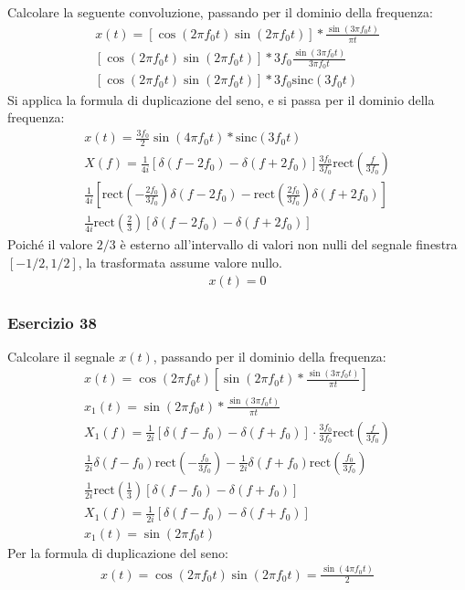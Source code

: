 \documentclass{article}
\newcommand{\rect}{\mathrm{rect}}
\newcommand{\sinc}{\mathrm{sinc}}
\begin{document}
Calcolare la seguente convoluzione, passando per il dominio della frequenza:
\begin{gather*}
    x(t)=\left[\cos(2\pi f_0t)\sin(2\pi f_0t)\right]*\displaystyle\frac{\sin(3\pi f_0t)}{\pi t}\\
    \left[\cos(2\pi f_0t)\sin(2\pi f_0t)\right]*\displaystyle3f_0\frac{\sin(3\pi f_0t)}{3\pi f_0t}\\
    \left[\cos(2\pi f_0t)\sin(2\pi f_0t)\right]*3f_0\sinc(3f_0 t)
\end{gather*}
Si applica la formula di duplicazione del seno, e si passa per il dominio della frequenza:
\begin{gather*}
    x(t)=\displaystyle\frac{3f_0}{2}\sin(4\pi f_0t)*\sinc(3f_0t)\\
    X(f)=\displaystyle\frac{1}{4i}\left[\delta(f-2f_0)-\delta(f+2f_0)\right]\frac{3f_0}{3f_0}\rect\left(\frac{f}{3f_0}\right)\\
    \displaystyle\frac{1}{4i}\left[\rect\left(-\frac{2f_0}{3f_0}\right)\delta(f-2f_0)-\rect\left(\frac{2f_0}{3f_0}\right)\delta(f+2f_0)\right]\\
    \displaystyle\frac{1}{4i}\rect\left(\frac{2}{3}\right)\left[\delta(f-2f_0)-\delta(f+2f_0)\right]
\end{gather*}
Poiché il valore $2/3$ è esterno all'intervallo di valori non nulli del segnale finestra $[-1/2,1/2]$, la trasformata assume valore nullo. 
\begin{gather}
    x(t)=0
\end{gather}

\subsubsection*{Esercizio 38}

Calcolare il segnale $x(t)$, passando per il dominio della frequenza:
\begin{gather*}
    x(t)=\cos(2\pi f_0t)\left[\sin(2\pi f_0t)*\displaystyle\frac{\sin(3\pi f_0t)}{\pi t}\right]\\
    x_1(t)=\sin(2\pi f_0t)*\displaystyle\frac{\sin(3\pi f_0t)}{\pi t}\\
    X_1(f)=\displaystyle\frac{1}{2i}\left[\delta(f-f_0)-\delta(f+f_0)\right]\cdot \frac{3f_0}{3f_0}\rect\left(\frac{f}{3f_0}\right)\\
    \displaystyle\frac{1}{2i}\delta(f-f_0)\rect\left(-\frac{f_0}{3f_0}\right)-\frac{1}{2i}\delta(f+f_0)\rect\left(\frac{f_0}{3f_0}\right)\\
    \displaystyle\frac{1}{2i}\rect\left(\frac{1}{3}\right)\left[\delta(f-f_0)-\delta(f+f_0)\right]\\
    X_1(f)=\displaystyle\frac{1}{2i}\left[\delta(f-f_0)-\delta(f+f_0)\right]\\
    x_1(t)=\sin(2\pi f_0t)
\end{gather*}
Per la formula di duplicazione del seno: 
\begin{gather}
    x(t)=\cos(2\pi f_0t)\sin(2\pi f_0t)=\displaystyle\frac{\sin(4\pi f_0t)}{2}
\end{gather}
\end{document}
